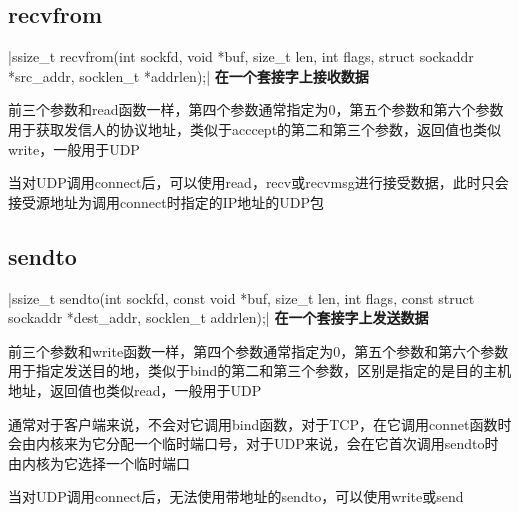 \subsection{recvfrom}
|ssize_t recvfrom(int sockfd, void *buf, size_t len, int flags, struct sockaddr *src_addr, socklen_t *addrlen);|
\noindent \textbf{在一个套接字上接收数据}
\begin{spacing}{2.0}
前三个参数和read函数一样，第四个参数通常指定为0，第五个参数和第六个参数用于获取发信人的协议地址，类似于acccept的第二和第三个参数，返回值也类似write，一般用于UDP

当对UDP调用connect后，可以使用read，recv或recvmsg进行接受数据，此时只会接受源地址为调用connect时指定的IP地址的UDP包
\end{spacing}
\newpage

\subsection{sendto}
|ssize_t sendto(int sockfd, const void *buf, size_t len, int flags, const struct sockaddr *dest_addr, socklen_t addrlen);|
\noindent \textbf{在一个套接字上发送数据}
\begin{spacing}{2.0}
前三个参数和write函数一样，第四个参数通常指定为0，第五个参数和第六个参数用于指定发送目的地，类似于bind的第二和第三个参数，区别是指定的是目的主机地址，返回值也类似read，一般用于UDP

通常对于客户端来说，不会对它调用bind函数，对于TCP，在它调用connet函数时会由内核来为它分配一个临时端口号，对于UDP来说，会在它首次调用sendto时由内核为它选择一个临时端口

当对UDP调用connect后，无法使用带地址的sendto，可以使用write或send
\end{spacing}
\newpage

